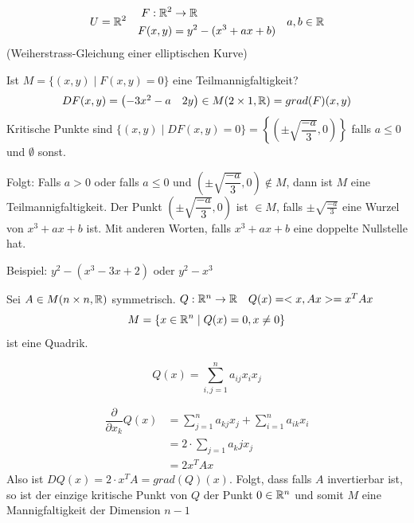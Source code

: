 \documentclass[main.tex]{subfiles}
\begin{document}
\begin{Beispiel}
  $$U = \mathbb{R}^2 \quad \begin{aligned}
    F : \mathbb{R}^2 & \to \mathbb{R} \\
    F(x,y) & = y^2 - (x^3 + ax + b)
  \end{aligned} \quad a,b \in \mathbb{R}$$
  (Weiherstrass-Gleichung einer elliptischen Kurve)

  \begin{center}
  \end{center}

  Ist $M = \{(x,y) \mid F(x,y) = 0\}$ eine Teilmannigfaltigkeit?
  $$DF(x,y) = \begin{pmatrix}
    - 3x^2 - a & 2y
  \end{pmatrix} \in M(2 \times 1, \mathbb{R}) = grad(F)(x,y)$$
  Kritische Punkte sind $\{(x,y) \mid DF(x,y) = 0\} = \left\{\left(\pm \sqrt{\dfrac{-a}{3}},0\right)\right\}$ falls $a \leq 0$ und $\emptyset$ sonst.

  Folgt: Falls $a > 0$ oder falls $a \leq 0$ und $\left(\pm \sqrt{\dfrac{-a}{3}},0\right) \notin M$, dann ist $M$ eine Teilmannigfaltigkeit.
  Der Punkt $\left(\pm \sqrt{\dfrac{-a}{3}},0\right)$ ist $\in M$, falls $\pm \sqrt{\frac{-a}{3}}$ eine Wurzel von $x^3 + ax + b$ ist. Mit anderen Worten, falls $x^3 + ax + b$ eine doppelte Nullstelle hat.

  Beispiel: $y^2 - (x^3 - 3x + 2)$ oder $y^2 - x^3$
\end{Beispiel}

\begin{Beispiel}
  Sei $A \in M(n \times n, \mathbb{R})$ symmetrisch.
  $Q: \mathbb{R}^n \to \mathbb{R} \quad Q(x) = <x, Ax> = x^T A x$
  $$M = \{x \in \mathbb{R}^n \mid Q(x) = 0, x \neq 0\}$$
  ist eine Quadrik.

  $$Q(x) = \sum \limits_{i,j = 1}^n a_{ij} x_i x_j$$

  $$\begin{aligned}
    \dfrac{\partial}{\partial x_k} Q(x) & = \sum \limits_{j=1}^n a_{kj} x_j + \sum \limits_{i = 1}^n a_{ik} x_i \\
    & = 2 \cdot \sum \limits_{j=1}a_kj x_j \\
    & = 2 x^T A x
  \end{aligned}$$
  Also ist $DQ(x) = 2 \cdot x^T A = grad(Q)(x)$. Folgt, dass falls $A$ invertierbar ist, so ist der einzige kritische Punkt von $Q$ der Punkt $0 \in \mathbb{R}^n$ und somit $M$ eine Mannigfaltigkeit der Dimension $n-1$
\end{Beispiel}
\end{document}
